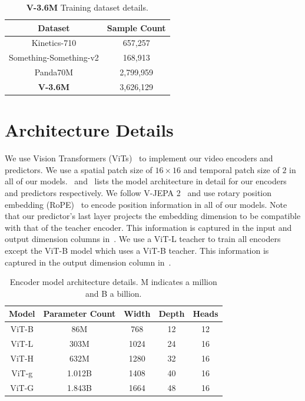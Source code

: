\documentclass{applemlr}
\numberwithin{equation}{section}
\begin{document}
\begin{table}[htbp]
    \centering
    \caption{\textbf{V-3.6M} Training dataset details.}
    \label{tab:appendix:training_dataset}

    \begin{tabular}{cc}
        \toprule
        Dataset & Sample Count \\
        \midrule
        Kinetics-710            & 657,257   \\
        Something-Something-v2  & 168,913   \\
        Panda70M                & 2,799,959 \\
        \midrule
        \textbf{V-3.6M}         & 3,626,129 \\
        \bottomrule
    \end{tabular}
\end{table}


\section{Architecture Details}
\label{appendix:sec:architecture}

We use Vision Transformers (ViTs)~\citep{vit_dosovitskiy2020} to implement our video encoders and predictors. We use a spatial patch size of $16 \times 16$ and temporal patch size of $2$ in all of our models.~ and~ lists the model architecture in detail for our encoders and predictors respectively. We follow V-JEPA 2~\citep{assran2025vjepa2} and use rotary position embedding (RoPE)~\citep{su2024roformer} to encode position information in all of our models. Note that our predictor's last layer projects the embedding dimension to be compatible with that of the teacher encoder. This information is captured in the input and output dimension columns in~. We use a ViT-L teacher to train all encoders except the ViT-B model which uses a ViT-B teacher. This information is captured in the output dimension column in~.


\begin{table}[htbp]
    \centering
    \caption{Encoder model architecture details. M indicates a million and B a billion.}
    \label{tab:appendix:model_arch:encoders}

    \begin{tabular}{ccccc}
        \toprule
        Model & Parameter Count & Width & Depth & Heads \\
        \midrule
        ViT-B & 86M      & 768  & 12 & 12 \\
        ViT-L & 303M     & 1024 & 24 & 16 \\
        ViT-H & 632M     & 1280 & 32 & 16 \\
        ViT-g & 1.012B   & 1408 & 40 & 16 \\
        ViT-G & 1.843B     & 1664 & 48 & 16 \\
        
    \end{tabular}
\end{table}
\end{document}
